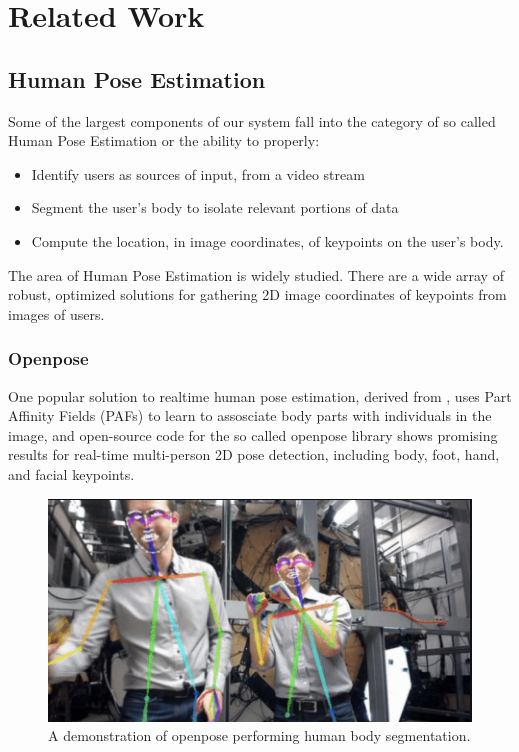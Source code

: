 \documentclass[10pt,twocolumn,letterpaper]{article}
\begin{document}
\section{Related Work}
\subsection{Human Pose Estimation}
Some of the largest components of our system fall into the category of so called Human 
Pose Estimation or the ability to properly:

\begin{itemize}
    \item Identify users as sources of input, from a video stream
    \item Segment the user's body to isolate relevant portions of data
    \item Compute the location, in image coordinates, of keypoints on the user's body.
\end{itemize}

The area of Human Pose Estimation is widely studied. There are a wide array of robust, optimized 
solutions for gathering 2D image coordinates of keypoints from images of users. 

\subsubsection{Openpose}
One popular solution to realtime human pose estimation, derived from \cite{8765346}, 
uses Part Affinity Fields (PAFs) to learn to assosciate body parts with individuals in the image, 
and open-source code for the so called openpose library shows promising results for real-time 
multi-person 2D pose detection, including body, foot, hand, and facial keypoints. 

\begin{figure}[h]
    \centering
    \includegraphics[width = .8\linewidth]{images/openpose.png}
    \caption{A demonstration of openpose performing human body segmentation.}
\end{figure}
\end{document}
